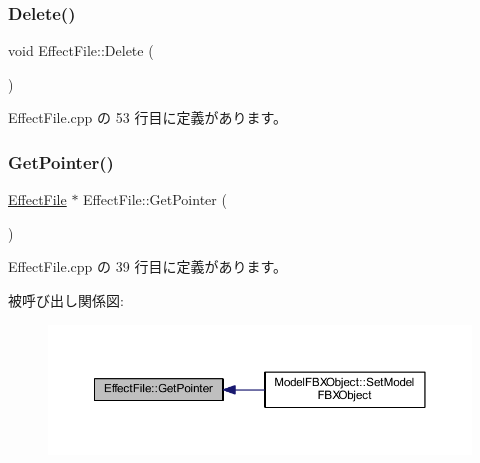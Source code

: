\subsubsection{\texorpdfstring{Delete()}{Delete()}}
{\footnotesize\ttfamily void Effect\+File\+::\+Delete (\begin{DoxyParamCaption}{ }\end{DoxyParamCaption})\hspace{0.3cm}{\ttfamily [static]}}



 Effect\+File.\+cpp の 53 行目に定義があります。

\mbox{\label{class_effect_file_a0f61b1e53e67b28cb46f93b6ba20f941}} 
\subsubsection{\texorpdfstring{Get\+Pointer()}{GetPointer()}}
{\footnotesize\ttfamily \mbox{\hyperlink{class_effect_file}{Effect\+File}} $\ast$ Effect\+File\+::\+Get\+Pointer (\begin{DoxyParamCaption}{ }\end{DoxyParamCaption})\hspace{0.3cm}{\ttfamily [static]}}



 Effect\+File.\+cpp の 39 行目に定義があります。

被呼び出し関係図\+:
\nopagebreak
\begin{figure}[H]
\begin{center}
\leavevmode
\includegraphics[width=350pt]{class_effect_file_a0f61b1e53e67b28cb46f93b6ba20f941_icgraph}
\end{center}
\end{figure}
\mbox{\label{class_effect_file_a8106530f6c71c81e7e2843cec9fe1094}} 
